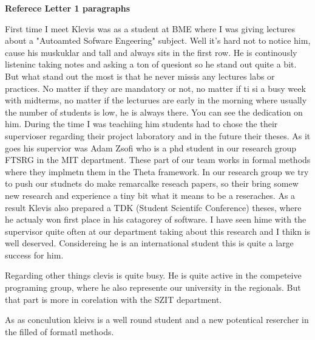 \documentclass[11pt, a4paper]{article}
\begin{document}
\textbf{Referece Letter 1 paragraphs}

\vspace{0.5cm}

First time I meet Klevis was as a student at BME where I was giving lectures
about a "Autoamted Sofware Engeering" subject. Well it's hard not to notice
him, cause his muskuklar and tall and always sits in the first row. He is
continously listeninc taking notes and asking a ton of quesiont so he stand out
quite a bit. But what stand out the most is that he never missis any lectures labs or practices.
No matter if they are mandatory or not, no matter if ti si a busy week with
midterms, no matter if the lecturues are early in the morning where usually the
number of students is low, he is always there. You can see the dedication 
on him. 
During the time I was teachiing him students had to chose the their supervioser 
regarding their project laboratory and in the future their theses. As it goes 
his supervior was Adam Zsofi who is a phd student in our research group FTSRG 
in the MIT department. These part of our team works in formal methods where 
they implmetn them in the Theta framework.
In our research group we try to push our studnets do make remarcalke reseach 
papers, so their bring somew new research and experience a tiny bit what 
it means to be a reseraches. As a result Klevis also prepared a TDK (Student Scientifc Conference)
theses, where he actualy won first place in his catagorey of software. 
I have seen hime with the supervisor quite often at our department 
taking about this research and I thikn is well deserved. 
Considereing he is an international student this is quite a large success for him.

Regarding other things clevis is quite busy.
He is quite active in the competeive programing group, where he also represente 
our university in the regionals.
But that part is more in corelation with the SZIT department. 

As as conculution kleivs is a well round student and a new potentical resercher 
in the filled of formatl methods. 
\end{document}
